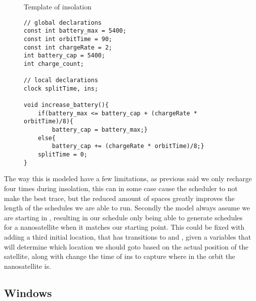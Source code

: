\begin{figure}
	\centering
	\caption{Template of insolation}
	\label{fig:cora_inso}
\end{figure}

\begin{figure}
	\begin{lstlisting}[language=my_c, caption={Declarations and function}, label=lst:insolation_code]
// global declarations
const int battery_max = 5400;
const int orbitTime = 90;
const int chargeRate = 2;
int battery_cap = 5400;
int charge_count;

// local declarations
clock splitTime, ins;

void increase_battery(){
	if(battery_max <= battery_cap + (chargeRate * orbitTime)/8){
		battery_cap = battery_max;}
	else{
		battery_cap += (chargeRate * orbitTime)/8;}
	splitTime = 0;
}
	\end{lstlisting}
\end{figure}

The way this is modeled have a few limitations, as previous said we only recharge four times during insolation, this can in some case cause the scheduler to not make the best trace, but the reduced amount of spaces greatly improves the length of the schedules we are able to run. Secondly the model always assume we are starting in , resulting in our schedule only being able to generate schedules for a nanosatellite when it matches our starting point. This could be fixed with adding a third initial location, that has transitions to  and , given a variables that will determine which location we should goto based on the actual position of the satellite, along with change the time of ins to capture where in the orbit the nanosatellite is. 


\subsection*{Windows}
